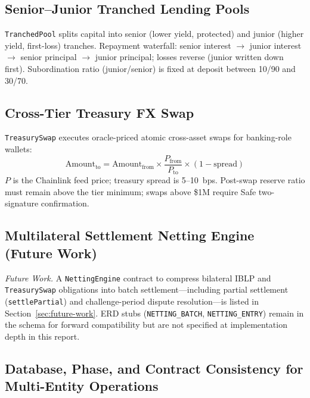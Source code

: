 \documentclass[12pt,a4paper]{report}
\begin{document}
\subsection{Senior--Junior Tranched Lending Pools}
\label{sec:tranched-pools}

\texttt{TranchedPool} splits capital into senior (lower yield, protected) and junior (higher yield, first-loss) tranches. Repayment waterfall: senior interest $\to$ junior interest $\to$ senior principal $\to$ junior principal; losses reverse (junior written down first). Subordination ratio (junior/senior) is fixed at deposit between 10/90 and 30/70.

\subsection{Cross-Tier Treasury FX Swap}
\label{sec:treasury-fx}

\texttt{TreasurySwap} executes oracle-priced atomic cross-asset swaps for banking-role wallets:
\begin{equation}
\text{Amount}_{\text{to}} = \text{Amount}_{\text{from}} \times \frac{P_{\text{from}}}{P_{\text{to}}} \times (1 - \text{spread})
\end{equation}
\noindent $P$ is the Chainlink feed price; treasury spread is 5--10~bps. Post-swap reserve ratio must remain above the tier minimum; swaps above \$1M require Safe two-signature confirmation.

\subsection{Multilateral Settlement Netting Engine (Future Work)}
\label{sec:netting-settlement}

\noindent\textit{Future Work.} A \texttt{NettingEngine} contract to compress bilateral IBLP and \texttt{TreasurySwap} obligations into batch settlement---including partial settlement (\texttt{settlePartial}) and challenge-period dispute resolution---is listed in Section~\ref{sec:future-work}. ERD stubs (\texttt{NETTING\_BATCH}, \texttt{NETTING\_ENTRY}) remain in the schema for forward compatibility but are not specified at implementation depth in this report.

\subsection{Database, Phase, and Contract Consistency for Multi-Entity Operations}
\label{sec:multi-entity-consistency}
\end{document}
